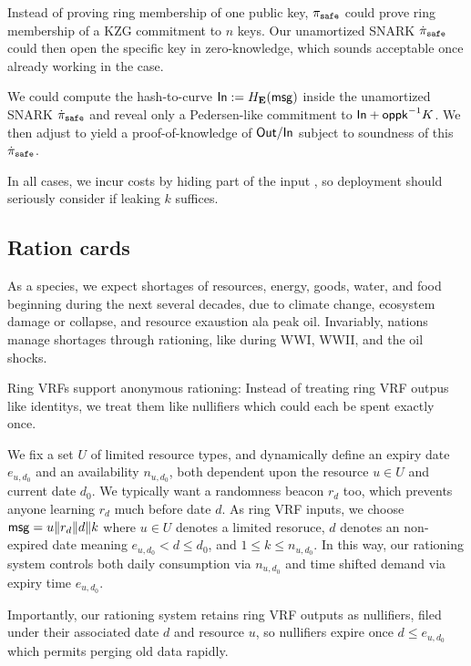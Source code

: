 Instead of proving ring membership of one public key,
$\pi_{\mathtt{safe}}$ could prove ring membership of a KZG commitment to $n$ keys.
Our unamortized SNARK $\dot{\pi}_{\mathtt{safe}}$ could then open the specific key in
zero-knowledge, which sounds acceptable once already working in the \pisafe case.

We could compute the hash-to-curve ${\mathsf{In}} := H_{{\mathbf{E}}}(\mathsf{msg})$ inside the
unamortized SNARK $\dot{\pi}_{\mathtt{safe}}$ and reveal only a Pedersen-like commitment
to ${\mathsf{In}} + \mathsf{oppk}^{-1} K$.  We then adjust \PedVRF to yield
a proof-of-knowledge of ${\mathsf{Out}}/{\mathsf{In}}$ subject to soundness of this
$\dot{\pi}_{\mathtt{safe}}$.

In all cases, we incur costs by hiding part of the input \msg, so
deployment should seriously consider if leaking $k$ suffices.


\subsection{Ration cards}

As a species, we expect shortages of resources, energy, goods, water,
and food beginning during the next several decades, due to climate change,
ecosystem damage or collapse, and resource exaustion ala peak oil. 
Invariably, nations manage shortages through rationing, like during
WWI, WWII, and the oil shocks.  

Ring VRFs support anonymous rationing:
Instead of treating ring VRF outpus like identitys,
we treat them like nullifiers which could each be spent exactly once.

\def\expiry{e}
We fix a set $U$ of limited resource types, and dynamically define
an expiry date $\expiry_{u,d_0}$ and an availability $n_{u,d_0}$, 
both dependent upon the resource $u \in U$ and current date $d_0$.
We typically want a randomness beacon $r_d$ too, which prevents
anyone learning $r_d$ much before date $d$. 
As ring VRF inputs, we choose
 $\mathsf{msg} = u \| r_d \| d \| k$
where $u \in U$ denotes a limited resoruce,
 $d$ denotes an non-expired date meaning $\expiry_{u,d_0} < d \le d_0$,
 and $1 \le k \le n_{u,d_0}$.
In this way, our rationing system controls both daily consumption
via $n_{u,d_0}$ and time shifted demand via expiry time $\expiry_{u,d_0}$.

Importantly, our rationing system retains ring VRF outputs as nullifiers,
filed under their associated date $d$ and resource $u$, so nullifiers
expire once $d \le \expiry_{u,d_0}$ which permits perging old data rapidly.

